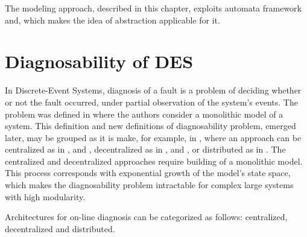 The modeling approach, described in this chapter, exploits automata framework
and, which makes the idea of abstraction applicable for it.




\section{Diagnosability of DES}

In Discrete-Event Systems, diagnosis of a fault is a problem of deciding whether
or not the fault occurred, under partial observation of the system's events.
The problem was defined in \cite{sampath_diagnosability_1995} where the authors
consider a monolithic model of a system. This definition and new definitions
of diagnosability problem, emerged later, may be grouped as it is make, for
example, in \cite{su_global_2005}, where an approach can be centralized as in
\cite{sampath_diagnosability_1995}, \cite{jiang_polynomial_2001} and
\cite{yoo_polynomial-time_2002}, 
decentralized as in \cite{debouk_coordinated_1998},
\cite{pencole_formal_2005} and \cite{qiu_decentralized_2006}, 
or distributed as in \cite{su_distributed_2002}.
The centralized and decentralized approaches require building of a monolithic
model. This process corresponds with exponential growth of the model's state
space, which makes the diagnosability problem intractable for complex large
systems with high modularity.

Architectures for on-line diagnosis can be categorized as follows:
centralized, decentralized and distributed.


